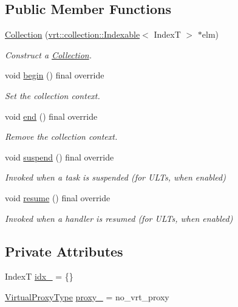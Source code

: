 \subsection*{Public Member Functions}
\begin{DoxyCompactItemize}
\item 
\hyperlink{structvt_1_1ctx_1_1_collection_ad845dcb56b8ba12adb1181bb0ea2ded5}{Collection} (\hyperlink{structvt_1_1vrt_1_1collection_1_1_indexable}{vrt\+::collection\+::\+Indexable}$<$ IndexT $>$ $\ast$elm)
\begin{DoxyCompactList}\small\item\em Construct a {\ttfamily \hyperlink{structvt_1_1ctx_1_1_collection}{Collection}}. \end{DoxyCompactList}\item 
void \hyperlink{structvt_1_1ctx_1_1_collection_a1555355c83dd6f692c03c66882b74846}{begin} () final override
\begin{DoxyCompactList}\small\item\em Set the collection context. \end{DoxyCompactList}\item 
void \hyperlink{structvt_1_1ctx_1_1_collection_afbbbbaa3a85469b7ddded1ded70bd83d}{end} () final override
\begin{DoxyCompactList}\small\item\em Remove the collection context. \end{DoxyCompactList}\item 
void \hyperlink{structvt_1_1ctx_1_1_collection_a8355e824435241b61bb9774b4546c0de}{suspend} () final override
\begin{DoxyCompactList}\small\item\em Invoked when a task is suspended (for U\+L\+Ts, when enabled) \end{DoxyCompactList}\item 
void \hyperlink{structvt_1_1ctx_1_1_collection_a4cf87cf7d38bd8d4706ffda41e31c9c6}{resume} () final override
\begin{DoxyCompactList}\small\item\em Invoked when a handler is resumed (for U\+L\+Ts, when enabled) \end{DoxyCompactList}\end{DoxyCompactItemize}
\subsection*{Private Attributes}
\begin{DoxyCompactItemize}
\item 
IndexT \hyperlink{structvt_1_1ctx_1_1_collection_ac4de6446eac1e860f9c141bb22aff818}{idx\+\_\+} = \{\}
\item 
\hyperlink{namespacevt_a1b417dd5d684f045bb58a0ede70045ac}{Virtual\+Proxy\+Type} \hyperlink{structvt_1_1ctx_1_1_collection_ad0a95fbcccdbcd0a525e809c81b6f148}{proxy\+\_\+} = no\+\_\+vrt\+\_\+proxy
\end{DoxyCompactItemize}


